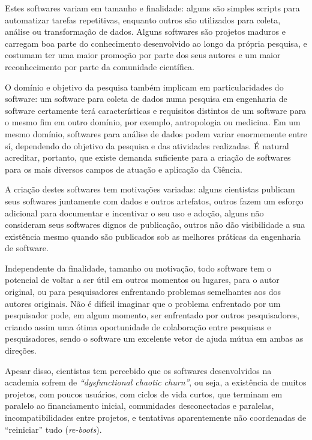 Estes softwares variam em tamanho e finalidade: alguns são simples
scripts para automatizar tarefas repetitivas, enquanto outros são utilizados para
coleta, análise ou transformação de dados. Alguns softwares são projetos maduros e
carregam boa parte do conhecimento desenvolvido ao longo da própria pesquisa, e
costumam ter uma maior promoção por parte dos seus autores e um maior
reconhecimento por parte da comunidade científica.

O domínio e objetivo da pesquisa também implicam em particularidades do software: 
um software para coleta de dados numa pesquisa em engenharia de
software certamente terá características e requisitos distintos de um software
para o mesmo fim em outro domínio, por exemplo,  antropologia ou medicina.
Em um mesmo domínio, softwares para análise de dados podem variar
enormemente entre sí, dependendo do objetivo da pesquisa e das atividades realizadas.
\'{E} natural acreditar, portanto, que existe demanda suficiente para a
criação de softwares para os mais diversos campos de atuação e aplicação da
Ciência.

A criação destes softwares tem motivações variadas:  alguns cientistas publicam
seus softwares juntamente com dados e outros artefatos, outros fazem um esforço
adicional para documentar e incentivar o seu uso e adoção, alguns não
consideram seus softwares dignos de publicação, outros não dão visibilidade a
sua existência mesmo quando são publicados sob as melhores práticas da
engenharia de software.

Independente da finalidade, tamanho ou motivação, todo software tem o potencial
de voltar a ser útil em outros momentos ou lugares, para o autor original,
ou para pesquisadores enfrentando problemas semelhantes aos dos autores originais.
Não é difícil imaginar que o problema enfrentado por um pesquisador pode, em
algum momento, ser enfrentado por outros pesquisadores, criando assim uma ótima
oportunidade de colaboração entre pesquisas e pesquisadores, sendo o software
um excelente vetor de ajuda mútua em ambas as direções.

Apesar disso, cientistas tem percebido que os softwares desenvolvidos na
academia sofrem de {\it ``dysfunctional chaotic churn''}, ou seja, a existência
de muitos projetos, com poucos usuários, com ciclos de vida curtos, que
terminam em paralelo ao financiamento inicial, comunidades desconectadas e
paralelas, incompatibilidades entre projetos, e tentativas aparentemente não
coordenadas de ``reiniciar'' tudo ({\it re-boots}).

